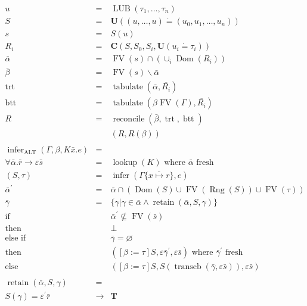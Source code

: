 \documentclass{article}
\newcommand{\assign}{:=}
\newcommand{\tmmathbf}[1]{\ensuremath{\boldsymbol{#1}}}
\newcommand{\tmop}[1]{\ensuremath{\operatorname{#1}}}
\begin{document}
\begin{eqnarray*}
  u & = & \tmop{LUB} (\tau_1, \ldots, \tau_n)\\
  S & = & \tmmathbf{U} ((u, \ldots, u) \dot{=} (u_0, u_1, \ldots, u_n))\\
  s & = & S (u)\\
  R_i & = & \tmmathbf{C} (S, S_0, S_i, \tmmathbf{U} (u_i \dot{=} \tau_i))\\
  \bar{\alpha} & = & \tmop{FV} (s) \cap (\cup_i \tmop{Dom} (R_i))\\
  \bar{\beta} & = & \tmop{FV} (s) \backslash \bar{\alpha}\\
  \tmop{trt} & = & \tmop{tabulate} (\bar{\alpha}, \overline{R_i})\\
  \tmop{btt} & = & \tmop{tabulate} (\beta \tmop{FV} (\Gamma),
  \overline{R_i})\\
  R & = & \tmop{reconcile} (\bar{\beta}, \tmop{trt}, \tmop{btt})\\
  &  & (R, R (\beta))\\
  &  & \\
  \tmop{infer}_{\tmop{ALT}} (\Gamma, \beta, K \bar{x} .e) & = & \\
  \forall \bar{\alpha} . \bar{r} \longrightarrow \varepsilon \bar{s} & = &
  \tmop{lookup} (K) \text{ \ where } \bar{\alpha} \text{ fresh}\\
  (S, \tau) & = & \tmop{infer} (\Gamma \{ \overline{x \mapsto r} \}, e)\\
  \bar{\alpha}^{\prime} & = & \bar{\alpha} \cap (\tmop{Dom} (S) \cup \tmop{FV}
  (\tmop{Rng} (S)) \cup \tmop{FV} (\tau))\\
  \bar{\gamma} & = & \{ \gamma | \gamma \in \bar{\alpha} \wedge \tmop{retain}
  (\bar{\alpha}, S, \gamma) \}\\
  \text{if} &  & \bar{\alpha}^{\prime} \nsubseteq \tmop{FV} (\bar{s})\\
  \text{then} &  & \bot\\
  \text{else if} &  & \bar{\gamma} = \varnothing\\
  \text{then} &  & ([\beta \assign \tau] S, \varepsilon \bar{\gamma}^{\prime},
  \varepsilon \bar{s}) \text{ where } \bar{\gamma}^{\prime} \text{ fresh}\\
  \text{else} &  & ([\beta \assign \tau] S, S (\tmop{transcb} (\bar{\gamma},
  \varepsilon \bar{s})), \varepsilon \bar{s})\\
  &  & \\
  \tmop{retain} (\bar{\alpha}, S, \gamma) & = & \\
  S (\gamma) = \varepsilon^{\prime}  \bar{r} & \rightarrow & \tmmathbf{T}\\

\end{eqnarray*}
\end{document}
